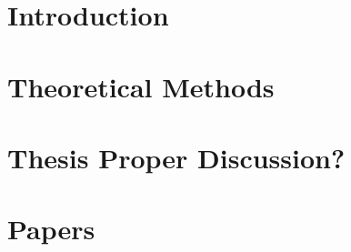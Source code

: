 \documentclass[oneside]{bThesis} %
\author{J\'on Bergmann Maronsson}
\title{\pending}
\begin{document}


\part{Introduction}
\label{part:introduction}

\part{Theoretical Methods}
\label{part:theory}

\part{Thesis Proper \pending Discussion?} 
\label{part:thesis}






\newpage
{}


\part{Papers}
\label{part:papers}
\appendix


%
\end{document}
